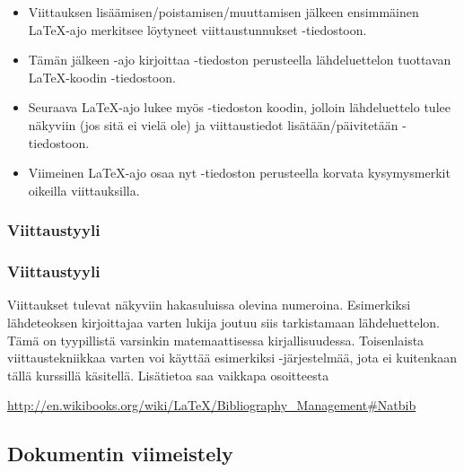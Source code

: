 \begin{fframe}
    \begin{extra}
        \begin{itemize}
            \item Viittauksen lisäämisen/poistamisen/muuttamisen jälkeen ensimmäinen \LaTeX-ajo merkitsee löytyneet viittaustunnukset -tiedostoon.
            \item Tämän jälkeen \BibTeX-ajo kirjoittaa -tiedoston perusteella lähdeluettelon tuottavan \LaTeX-koodin -tiedostoon.
            \item Seuraava \LaTeX-ajo lukee myös -tiedoston koodin, jolloin lähdeluettelo tulee näkyviin (jos sitä ei vielä ole) ja viittaustiedot lisätään/päivitetään -tiedostoon.
            \item Viimeinen \LaTeX-ajo osaa nyt -tiedoston perusteella korvata kysymysmerkit oikeilla viittauksilla.
        \end{itemize}
    \end{extra}
\end{fframe}
%
\subsubsection{Viittaustyyli}
\begin{fframe}
    \frametitle{Viittaustyyli}
    Viittaukset tulevat näkyviin hakasuluissa olevina numeroina. Esimerkiksi lähdeteoksen kirjoittajaa varten lukija joutuu siis tarkistamaan lähdeluettelon. Tämä on tyypillistä varsinkin matemaattisessa kirjallisuudessa. 
    \vaihto
    Toisenlaista viittaustekniikkaa varten voi käyttää esimerkiksi -järjestelmää, jota ei kuitenkaan tällä kurssillä käsitellä. Lisätietoa saa vaikkapa osoitteesta
    \begin{scriptsize}
        \url{http://en.wikibooks.org/wiki/LaTeX/Bibliography_Management#Natbib}
    \end{scriptsize}
\end{fframe}


\subsection{Dokumentin viimeistely}

